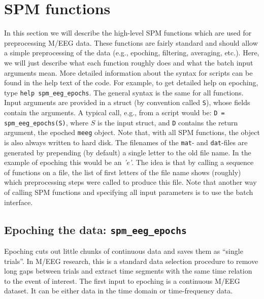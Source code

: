 \section{SPM functions}
In this section we will describe the high-level SPM functions which are used for preprocessing M/EEG data. These functions are fairly standard and should allow a simple preprocessing of the data (e.g., epoching, filtering, averaging, etc.). Here, we will just describe what each function roughly does and what the batch input arguments mean. More detailed information about the syntax for scripts can be found in the help text of the code. For example, to get detailed help on epoching, type \texttt{help spm\_eeg\_epochs}. The general syntax is the same for all functions. Input arguments are provided in a struct (by convention called \texttt{S}), whose fields contain the arguments. A typical call, e.g., from a script would be: \texttt{D = spm\_eeg\_epochs(S)}, where $S$ is the input struct, and \texttt{D} contains the return argument, the epoched \texttt{meeg} object. Note that, with all SPM functions, the object is also always written to hard disk. The filenames of the \texttt{mat}- and \texttt{dat}-files are generated by prepending (by default) a single letter to the old file name. In the example of epoching this would be an \textit{'e'}. The idea is that by calling a sequence of functions on a file, the list of first letters of the file name shows (roughly) which preprocessing steps were called to produce this file. Note that another way of calling SPM functions and specifying all input parameters is to use the batch interface.

\subsection{Epoching the data: \texttt{spm\_eeg\_epochs}}
Epoching cuts out little chunks of continuous data and saves them as ``single trials''. In M/EEG research, this is a standard data selection procedure to remove long gaps between trials and extract time segments with the same time relation to the event of interest. The first input to epoching is a continuous M/EEG dataset. It can be either data in the time domain or time-frequency data. 

